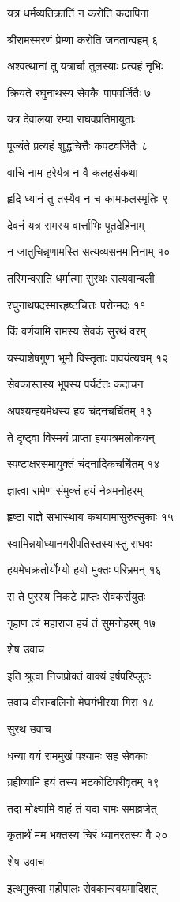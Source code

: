 यत्र धर्मव्यतिक्रांतिं न करोति कदापिना

श्रीरामस्मरणं प्रेम्णा करोति जनतान्वहम् ६

अश्वत्थानां तु यत्रार्चा तुलस्याः प्रत्यहं नृभिः

क्रियते रघुनाथस्य सेवकैः पापवर्जितैः ७

यत्र देवालया रम्या राघवप्रतिमायुताः

पूज्यंते प्रत्यहं शुद्धचित्तैः कपटवर्जितैः ८

वाचि नाम हरेर्यत्र न वै कलहसंकथा

हृदि ध्यानं तु तस्यैव न च कामफलस्मृतिः ९

देवनं यत्र रामस्य वार्त्ताभिः पूतदेहिनाम्

न जातुचिन्नृणामस्ति सत्यव्यसनमानिनाम् १०

तस्मिन्वसति धर्मात्मा सुरथः सत्यवान्बली

रघुनाथपदस्मारहृष्टचित्तः परोन्मदः ११

किं वर्णयामि रामस्य सेवकं सुरथं वरम्

यस्याशेषगुणा भूमौ विस्तृताः पावयंत्यघम् १२

सेवकास्तस्य भूपस्य पर्यटंतः कदाचन

अपश्यन्हयमेधस्य हयं चंदनचर्चितम् १३

ते दृष्ट्वा विस्मयं प्राप्ता हयपत्रमलोकयन्

स्पष्टाक्षरसमायुक्तं चंदनादिकचर्चितम् १४

ज्ञात्वा रामेण संमुक्तं हयं नेत्रमनोहरम्

हृष्टा राज्ञे सभास्थाय कथयामासुरुत्सुकाः १५

स्वामिन्नयोध्यानगरीपतिस्तस्यास्तु राघवः

हयमेधक्रतोर्योग्यो हयो मुक्तः परिभ्रमन् १६

स ते पुरस्य निकटे प्राप्तः सेवकसंयुतः

गृहाण त्वं महाराज हयं तं सुमनोहरम् १७

शेष उवाच

इति श्रुत्वा निजप्रोक्तं वाक्यं हर्षपरिप्लुतः

उवाच वीरान्बलिनो मेघगंभीरया गिरा १८

सुरथ उवाच

धन्या वयं राममुखं पश्यामः सह सेवकाः

ग्रहीष्यामि हयं तस्य भटकोटिपरीवृतम् १९

तदा मोक्ष्यामि वाहं तं यदा रामः समाव्रजेत्

कृतार्थं मम भक्तस्य चिरं ध्यानरतस्य वै २०

शेष उवाच

इत्थमुक्त्वा महीपालः सेवकान्स्वयमादिशत्

